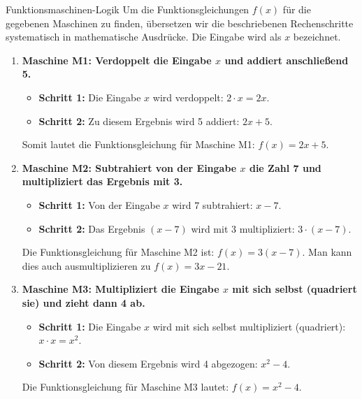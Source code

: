\begin{loesungsumgebung}{Funktionsmaschinen-Logik}
Um die Funktionsgleichungen $f(x)$ für die gegebenen Maschinen zu finden, übersetzen wir die beschriebenen Rechenschritte systematisch in mathematische Ausdrücke. Die Eingabe wird als $x$ bezeichnet.

\begin{enumerate}
    \item \textbf{Maschine M1: Verdoppelt die Eingabe $x$ und addiert anschließend 5.}
    \begin{itemize}
        \item \textbf{Schritt 1:} Die Eingabe $x$ wird verdoppelt: $2 \cdot x = 2x$.
        \item \textbf{Schritt 2:} Zu diesem Ergebnis wird 5 addiert: $2x + 5$.
    \end{itemize}
    Somit lautet die Funktionsgleichung für Maschine M1:
    $f(x) = 2x + 5$.

    \item \textbf{Maschine M2: Subtrahiert von der Eingabe $x$ die Zahl 7 und multipliziert das Ergebnis mit 3.}
    \begin{itemize}
        \item \textbf{Schritt 1:} Von der Eingabe $x$ wird 7 subtrahiert: $x - 7$.
        \item \textbf{Schritt 2:} Das Ergebnis $(x-7)$ wird mit 3 multipliziert: $3 \cdot (x - 7)$.
    \end{itemize}
    Die Funktionsgleichung für Maschine M2 ist:
    $f(x) = 3(x - 7)$.
    Man kann dies auch ausmultiplizieren zu $f(x) = 3x - 21$.

    \item \textbf{Maschine M3: Multipliziert die Eingabe $x$ mit sich selbst (quadriert sie) und zieht dann 4 ab.}
    \begin{itemize}
        \item \textbf{Schritt 1:} Die Eingabe $x$ wird mit sich selbst multipliziert (quadriert): $x \cdot x = x^2$.
        \item \textbf{Schritt 2:} Von diesem Ergebnis wird 4 abgezogen: $x^2 - 4$.
    \end{itemize}
    Die Funktionsgleichung für Maschine M3 lautet:
    $f(x) = x^2 - 4$.


\end{enumerate}
\end{loesungsumgebung}
